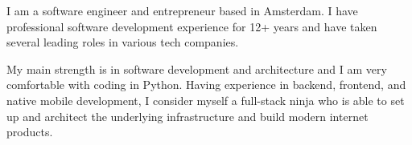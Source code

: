 

\begin{cvparagraph}

I am a software engineer and entrepreneur based in Amsterdam. I have professional software development experience for 12+ years and have taken several leading roles in various tech companies. 

My main strength is in software development and architecture and I am very comfortable with coding in Python. Having experience in backend, frontend, and native mobile development, I consider myself a full-stack ninja who is able to set up and architect the underlying infrastructure and build modern internet products. 

\end{cvparagraph}
